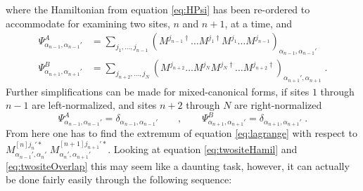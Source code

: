 where the Hamiltonian from equation \ref{eq:HPsi} has been re-ordered to accommodate for examining two sites, $n$ and $n+1$, at a time, and 
\begin{align}
\Psi_{\alpha_{n-1},\alpha_{n-1}'}^{A} &= \sum_{j_1 , \ldots , j_{n-1}} \left( M^{j_{n-1} \dag} \ldots M^{j_{1} \dag} M^{j_1} \ldots M^{j_{n-1}} \right) _{\alpha_{n-1} , \alpha_{n-1} '} \label{eq:psiA} \\
\Psi_{\alpha_{n+1},\alpha_{n+1}'}^{B} &= \sum_{j_{n+2} , \ldots , j_{N}} \left( M^{j_{n+2} } \ldots M^{j_{N} } M^{j_N \dag} \ldots M^{j_{n+2} \dag} \right) _{\alpha_{n+1} ', \alpha_{n+1} } \; .
\end{align}
Further simplifications can be made for mixed-canonical forms, if sites $1$ through $n-1$ are left-normalized, and sites $n+2$ through $N$ are right-normalized
\begin{equation}
	\Psi_{\alpha_{n-1},\alpha_{n-1}'}^{A} = \delta_{\alpha_{n-1},\alpha_{n-1}'} \qquad , \qquad \Psi_{\alpha_{n+1},\alpha_{n+1}'}^{B} = \delta_{\alpha_{n+1},\alpha_{n+1}'} \; .
\end{equation}
From here one has to find the extremum of equation \ref{eq:lagrange} with respect to $M_{\alpha_{n-1} ' , \alpha_{n} '}^{[n] j_n ' *} \; M_{\alpha_{n} ' , \alpha_{n+1} '}^{[n+1] j_{n+1} ' *}$. Looking at equation \ref{eq:twositeHamil} and \ref{eq:twositeOverlap} this may seem like a daunting task, however, it can actually be done fairly easily through the following sequence:

